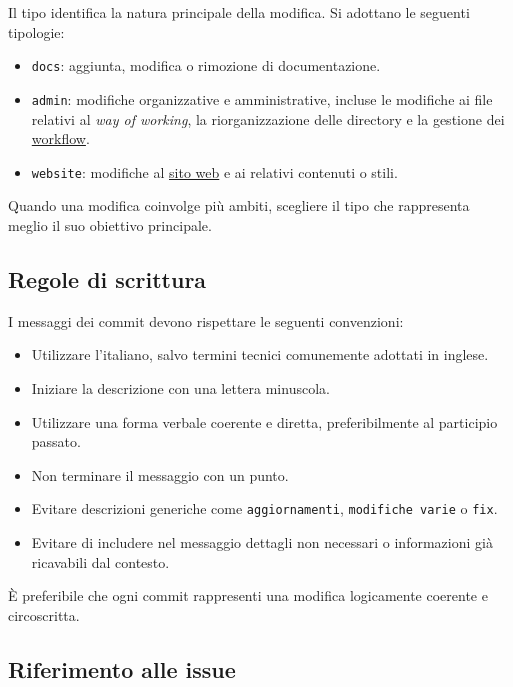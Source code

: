 \documentclass[11pt, a4paper]{article}
\begin{document}
Il tipo identifica la natura principale della modifica. Si adottano le seguenti tipologie:
\begin{itemize}
    \item \texttt{docs}: aggiunta, modifica o rimozione di documentazione.
    \item \texttt{admin}: modifiche organizzative e amministrative, incluse le modifiche ai file relativi al \textit{way of working}, la riorganizzazione delle directory e la gestione dei \href{https://github.com/On-By-One-Team/On-By-One.github.io/tree/main/.github/workflows}{workflow}.
    \item \texttt{website}: modifiche al \href{https://on-by-one-team.github.io/On-By-One.github.io/}{sito web} e ai relativi contenuti o stili.
\end{itemize}

\noindent Quando una modifica coinvolge più ambiti, scegliere il tipo che rappresenta meglio il suo obiettivo principale.

\subsection{Regole di scrittura}

I messaggi dei commit devono rispettare le seguenti convenzioni:
\begin{itemize}
    \item Utilizzare l'italiano, salvo termini tecnici comunemente adottati in inglese.
    \item Iniziare la descrizione con una lettera minuscola.
    \item Utilizzare una forma verbale coerente e diretta, preferibilmente al participio passato.
    \item Non terminare il messaggio con un punto.
    \item Evitare descrizioni generiche come \texttt{aggiornamenti}, \texttt{modifiche varie} o \texttt{fix}.
    \item Evitare di includere nel messaggio dettagli non necessari o informazioni già ricavabili dal contesto.
\end{itemize}

\noindent È preferibile che ogni commit rappresenti una modifica logicamente coerente e circoscritta.

\subsection{Riferimento alle issue}
\end{document}

